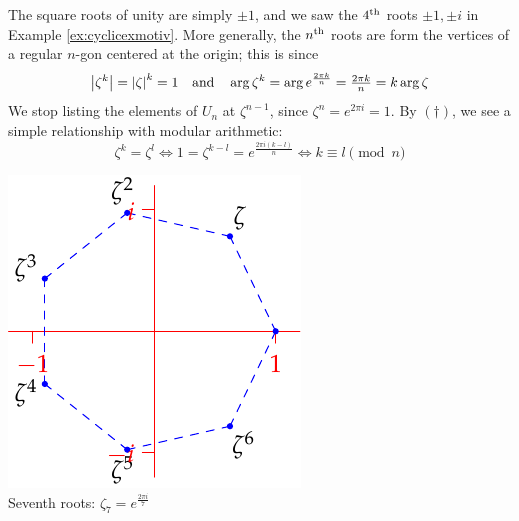 \begin{minipage}[t]{0.67\linewidth}\vspace{0pt}
	The square roots of unity are simply $\pm 1$, and we saw the $4\textsuperscript{th}$ roots $\pm 1,\pm i$ in Example \ref{ex:cyclicexmotiv}. More generally, the $n\textsuperscript{th}$ roots are form the vertices of a regular $n$-gon centered at the origin; this is since
	\[
		\left| \zeta^k\right|=\left| \zeta\right|^k=1
		\quad\text{and}\quad
		\arg\zeta^k=\arg e^{\frac{2\pi k}{n}}=\tfrac{2\pi k}n=k\arg\zeta
	\]
	We stop listing the elements of $U_n$ at $\zeta^{n-1}$, since $\zeta^n=e^{2\pi i}=1$. By $(\dag)$, we see a simple relationship with modular arithmetic:
	\[
		\zeta^k=\zeta^l\iff 1=\zeta^{k-l}=e^{\frac{2\pi i(k-l)}n}\iff k\equiv l\pmod n
	\]
\end{minipage}
\hfill
\begin{minipage}[t]{0.24\linewidth}\vspace{0pt}
	\centering
	\includegraphics[scale=0.8]{cyclic-rootunity}\\
	Seventh roots: $\zeta_7=e^{\frac{2\pi i}7}$
\end{minipage}
\bigbreak

% 
% 

